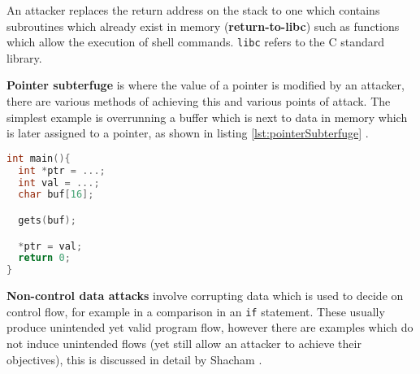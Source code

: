 An attacker replaces the return address on the stack to one which contains subroutines which already exist in memory (\textbf{return-to-libc}) such as functions which allow the execution of shell commands. \verb|libc| refers to the C standard library.

\textbf{Pointer subterfuge} is where the value of a pointer is modified by an attacker, there are various methods of achieving this and various points of attack. The simplest example is overrunning a buffer which is next to data in memory which is later assigned to a pointer, as shown in listing \ref{lst:pointerSubterfuge} \cite{Wang2016a}.

\begin{lstlisting}[language={C},caption={An example of code which is vulnerable to pointer subterfuge \cite{Wang2016a}},label={lst:pointerSubterfuge}]
int main(){
  int *ptr = ...;
  int val = ...;
  char buf[16];

  gets(buf);

  *ptr = val;
  return 0;
}
\end{lstlisting}


\textbf{Non-control data attacks} involve corrupting data which is used to decide on control flow, for example in a comparison in an \verb|if| statement. These usually produce unintended yet valid program flow, however there are examples which do not induce unintended flows (yet still allow an attacker to achieve their objectives), this is discussed in detail by Shacham \cite{Shacham2007}.